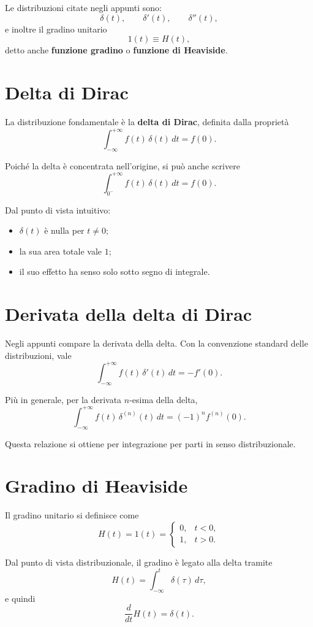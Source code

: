 Le distribuzioni citate negli appunti sono:
\[
\delta(t),\qquad \delta'(t),\qquad \delta''(t),
\]
e inoltre il gradino unitario
\[
1(t)\equiv H(t),
\]
detto anche \textbf{funzione gradino} o \textbf{funzione di Heaviside}.

\section{Delta di Dirac}

La distribuzione fondamentale è la \textbf{delta di Dirac}, definita dalla proprietà
\[
\int_{-\infty}^{+\infty} f(t)\,\delta(t)\,dt = f(0).
\]

Poiché la delta è concentrata nell'origine, si può anche scrivere
\[
\int_{0^-}^{+\infty} f(t)\,\delta(t)\,dt = f(0).
\]

Dal punto di vista intuitivo:
\begin{itemize}
    \item \(\delta(t)\) è nulla per \(t\neq 0\);
    \item la sua area totale vale \(1\);
    \item il suo effetto ha senso solo sotto segno di integrale.
\end{itemize}

\section{Derivata della delta di Dirac}

Negli appunti compare la derivata della delta. Con la convenzione standard delle distribuzioni,
vale
\[
\int_{-\infty}^{+\infty} f(t)\,\delta'(t)\,dt = -f'(0).
\]

Più in generale, per la derivata \(n\)-esima della delta,
\[
\int_{-\infty}^{+\infty} f(t)\,\delta^{(n)}(t)\,dt
=
(-1)^n f^{(n)}(0).
\]

Questa relazione si ottiene per integrazione per parti in senso distribuzionale.

\section{Gradino di Heaviside}

Il gradino unitario si definisce come
\[
H(t)=1(t)=
\begin{cases}
0, & t<0,\\
1, & t>0.
\end{cases}
\]

Dal punto di vista distribuzionale, il gradino è legato alla delta tramite
\[
H(t)=\int_{-\infty}^{t}\delta(\tau)\,d\tau,
\]
e quindi
\[
\frac{d}{dt}H(t)=\delta(t).
\]

